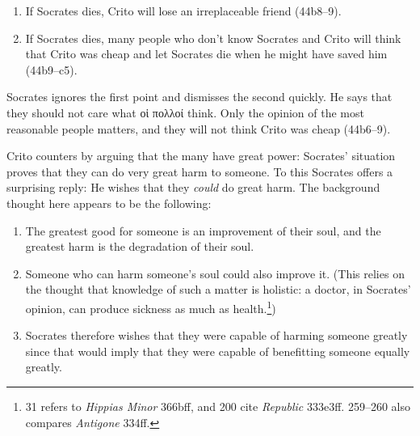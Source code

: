 \documentclass[12pt,letterpaper]{article}
\begin{document}
\begin{enumerate}

    \item If Socrates dies, Crito will lose an irreplaceable friend
        (44b8--9).

    \item If Socrates dies, many people who don't know Socrates and Crito will think that Crito was cheap and let Socrates die when he might have saved him (44b9--c5).

\end{enumerate}

Socrates ignores the first point and dismisses the second quickly. He says that they should not care what \textgreek{οἱ πολλοί} think. Only the opinion of the most reasonable people matters, and they will not think Crito was cheap (44b6--9).

Crito counters by arguing that the many have great power: Socrates' situation proves that they can do very great harm to someone. To this Socrates offers a surprising reply: He wishes that they \emph{could} do great harm. The background thought here appears to be the following:

\begin{enumerate}

    \item The greatest good for someone is an improvement of their soul, and the greatest harm is the degradation of their soul.

    \item Someone who can harm someone's soul could also improve it. (This relies on the thought that knowledge of such a matter is holistic: a doctor, in Socrates' opinion, can produce sickness as much as health.\footnote{\cite{adam1988-crito} 31 refers to \textit{Hippias Minor} 366bff, and \cite{brickhouse-smith2004-plato-trial-of-socrates} 200 cite \textit{Republic} 333e3ff. \cite{burnet1924-euthyphro-apology-crito} 259--260 also compares \textit{Antigone} 334ff.})

    \item Socrates therefore wishes that they were capable of harming someone greatly since that would imply that they were capable of benefitting someone equally greatly.

\end{enumerate}
\end{document}
